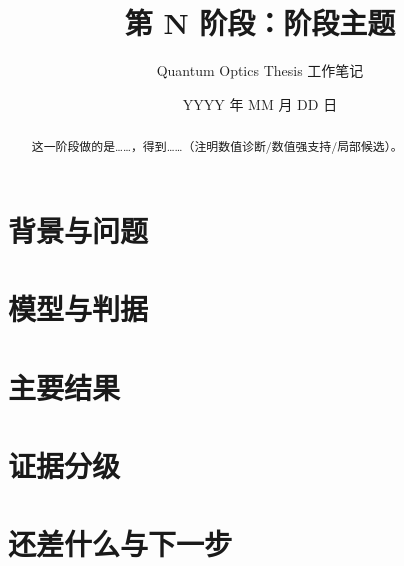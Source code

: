 \documentclass[UTF8,11pt,a4paper]{ctexart}
\title{第 N 阶段：阶段主题}
\author{Quantum Optics Thesis 工作笔记}
\date{YYYY 年 MM 月 DD 日}
\begin{document}
\maketitle

\begin{abstract}
这一阶段做的是……，得到……（注明数值诊断/数值强支持/局部候选）。
\end{abstract}

\section{背景与问题}

\section{模型与判据}

\section{主要结果}

\section{证据分级}

\section{还差什么与下一步}

\printbibliography[title={参考文献}]
\end{document}
